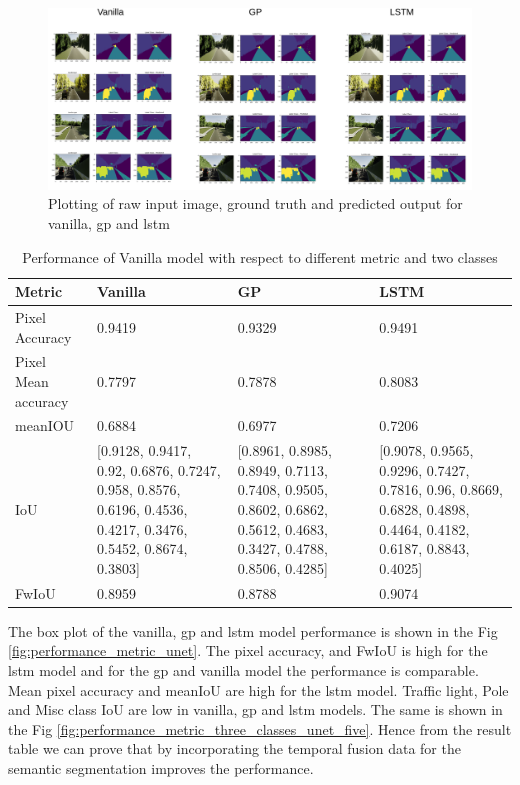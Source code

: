 	\begin{figure}
		\centering
		\includegraphics[width=17cm]{images/unet_vkitti_five.png}
		\caption{Plotting of raw input image, ground truth and predicted output for vanilla, gp and lstm}
		\label{fig:unet_side_by_side_five_classes}
	\end{figure}

	\begin{table}
		\begin{center}
			\begin{tabular}{ | l | p{4cm} | p{4cm} | p{4cm} |}
				\hline
				
				\cellcolor{purple!30}Metric & \cellcolor{purple!30}Vanilla & \cellcolor{purple!30}GP & \cellcolor{purple!30}LSTM\\ \hline
				Pixel Accuracy & 0.9419 & 0.9329 & 0.9491 \\ \hline
				Pixel Mean accuracy & 0.7797 & 0.7878 & 0.8083 \\ \hline
				meanIOU & 0.6884 & 0.6977 & 0.7206 \\ \hline
				IoU & [0.9128, 0.9417, 0.92, 0.6876, 0.7247, 0.958, 0.8576, 0.6196, 0.4536, 0.4217, 0.3476, 0.5452, 0.8674, 0.3803] & 
				[0.8961, 0.8985, 0.8949, 0.7113, 0.7408, 0.9505, 0.8602, 0.6862, 0.5612, 0.4683, 0.3427, 0.4788, 0.8506, 0.4285]
				& [0.9078, 0.9565, 0.9296, 0.7427, 0.7816, 0.96, 0.8669, 0.6828, 0.4898, 0.4464, 0.4182, 0.6187, 0.8843, 0.4025]
				\\ \hline
				FwIoU & 0.8959 & 0.8788 & 0.9074 \\ \hline
				\hline
			\end{tabular}
			\caption{Performance of Vanilla model with respect to different metric and two classes}
			\label{table:Vanilla_conti_seq}
		\end{center}
	\end{table}
	
	The box plot of the vanilla, gp and lstm model performance is shown in the Fig \ref{fig:performance_metric_unet}. The pixel accuracy, and  FwIoU is high for the lstm model and for the gp and vanilla model the performance is comparable. Mean pixel accuracy and meanIoU are high for the lstm model. Traffic light, Pole and Misc class IoU are low in vanilla, gp and lstm models. The same is shown in the Fig \ref{fig:performance_metric_three_classes_unet_five}. Hence from the result table we can prove that by incorporating the temporal fusion data for the semantic segmentation improves the performance. 
	
